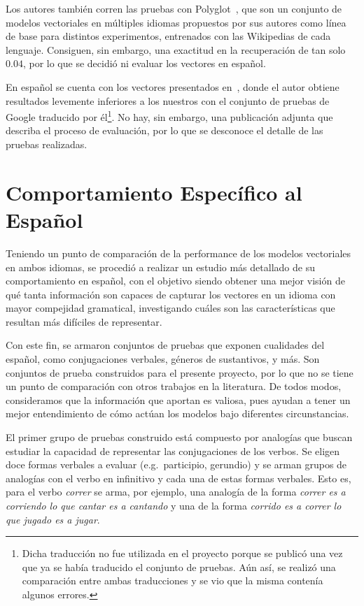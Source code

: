 Los autores también corren las pruebas con Polyglot~\cite{AlRfou2013}, que son un conjunto de
modelos vectoriales en múltiples idiomas propuestos por sus autores como línea de base para
distintos experimentos, entrenados con las Wikipedias de cada lenguaje. Consiguen, sin embargo, una
exactitud en la recuperación de tan solo $0.04$, por lo que se decidió ni evaluar los vectores en
español.

En español se cuenta con los vectores presentados en~\cite{SBWCE}, donde el autor obtiene resultados
levemente inferiores a los nuestros con el conjunto de pruebas de Google traducido por
él\footnote{Dicha traducción no fue utilizada en el proyecto porque se publicó una vez que ya se
había traducido el conjunto de pruebas. Aún así, se realizó una comparación entre ambas traducciones
y se vio que la misma contenía algunos errores.}. No hay, sin embargo, una publicación adjunta que
describa el proceso de evaluación, por lo que se desconoce el detalle de las pruebas realizadas.


\section{Comportamiento Específico al Español}

Teniendo un punto de comparación de la performance de los modelos vectoriales en ambos idiomas, se
procedió a realizar un estudio más detallado de su comportamiento en español, con el objetivo siendo
obtener una mejor visión de qué tanta información son capaces de capturar los vectores en un idioma
con mayor compejidad gramatical, investigando cuáles son las características que resultan más
difíciles de representar.

Con este fin, se armaron conjuntos de pruebas que exponen cualidades del español, como conjugaciones
verbales, géneros de sustantivos, y más. Son conjuntos de prueba construidos para el presente
proyecto, por lo que no se tiene un punto de comparación con otros trabajos en la literatura. De
todos modos, consideramos que la información que aportan es valiosa, pues ayudan a tener un mejor
entendimiento de cómo actúan los modelos bajo diferentes circunstancias.


El primer grupo de pruebas construido está compuesto por analogías que buscan estudiar la capacidad
de representar las conjugaciones de los verbos. Se eligen doce formas verbales a evaluar
(e.g.\ participio, gerundio) y se arman grupos de analogías con el verbo en infinitivo y cada una de
estas formas verbales. Esto es, para el verbo \textit{correr} se arma, por ejemplo, una analogía de
la forma \textit{correr es a corriendo lo que cantar es a cantando} y una de la forma
\textit{corrido es a correr lo que jugado es a jugar}.

